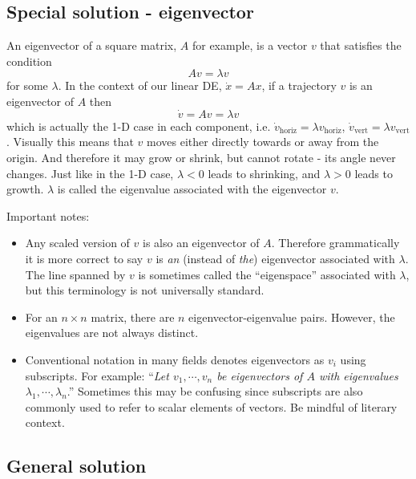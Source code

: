\documentclass[11pt, oneside]{article}   	%
\begin{document}
\subsection*{Special solution - eigenvector}

An eigenvector of a square matrix, $A$ for example, is a vector $v$ that satisfies the condition
\begin{equation}
Av = \lambda v
\end{equation}
for some $\lambda$.
In the context of our linear DE, $\dot{x} = Ax$, if a trajectory $v$ is an eigenvector of $A$ then
\begin{equation}
\dot{v} = Av = \lambda v
\end{equation}
which is actually the 1-D case in each component,
i.e. $\dot{v}_\mathrm{horiz} = \lambda v_\mathrm{horiz}$, $\dot{v}_\mathrm{vert} = \lambda v_\mathrm{vert}$.
Visually this means that $v$ moves either directly towards or away from the origin.
And therefore it may grow or shrink, but cannot rotate - its angle never changes.
Just like in the 1-D case, $\lambda < 0$ leads to shrinking, and $\lambda > 0$ leads to growth.
$\lambda$ is called the eigenvalue associated with the eigenvector $v$.

Important notes:
\begin{itemize}
\item Any scaled version of $v$ is also an eigenvector of $A$.
Therefore grammatically it is more correct to say $v$ is \textit{an} (instead of \textit{the}) eigenvector associated with $\lambda$.
The line spanned by $v$ is sometimes called the ``eigenspace'' associated with $\lambda$, but this terminology is not universally standard.
\item For an $n\times n$ matrix, there are $n$ eigenvector-eigenvalue pairs. However, the eigenvalues are not always distinct.
\item Conventional notation in many fields denotes eigenvectors as $v_i$ using subscripts.
For example: ``\textit{Let $ v_1,\cdots,v_n $ be eigenvectors of $A$ with eigenvalues $ \lambda_1,\cdots,\lambda_n $}.''
Sometimes this may be confusing since subscripts are also commonly used to refer to scalar elements of vectors.
Be mindful of literary context.
\end{itemize}

\subsection*{General solution}
\end{document}
